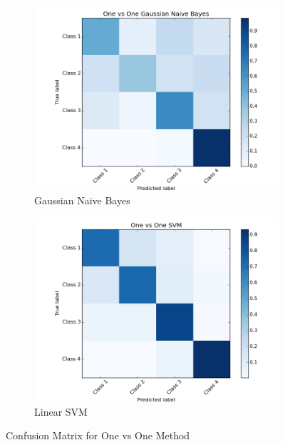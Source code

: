 \documentclass[11pt]{article}
\begin{document}
\begin{figure}[h]
	
	\begin{subfigure}[b]{0.5\textwidth}
		\includegraphics[width=\textwidth]{ovo_gnb.png}
		\caption{Gaussian Naive Bayes}
	\end{subfigure}
	\begin{subfigure}[b]{0.5\textwidth}
		\includegraphics[width=\textwidth]{ovo_svm.png}
		\caption{Linear SVM}
	\end{subfigure}
	\caption{Confusion Matrix for One vs One Method}
	\label{fig:cm_ovo}
\end{figure}
\end{document}
